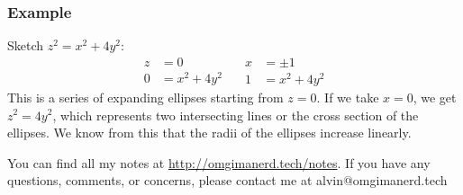 \documentclass{math}
\begin{document}
\subsubsection*{Example}
Sketch \( z^2 = x^2+4y^2 \):
\[ \begin{split}
  z &= 0 \\
  0 &= x^2+4y^2
\end{split}\quad\begin{split}
  x &= \pm1 \\
  1 &= x^2+4y^2
\end{split} \]
This is a series of expanding ellipses starting from \( z = 0 \). If we take
\( x = 0 \), we get \( z^2 = 4y^2 \), which represents two intersecting lines
or the cross section of the ellipses. We know from this that the radii of the
ellipses increase linearly.

\begin{center}
  You can find all my notes at \url{http://omgimanerd.tech/notes}. If you have
  any questions, comments, or concerns, please contact me at
  alvin@omgimanerd.tech
\end{center}
\end{document}
